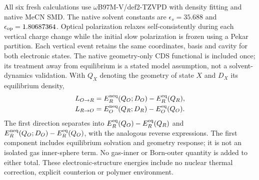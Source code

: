 \documentclass[11pt]{article}
\begin{document}
All six fresh calculations use $\omega$B97M-V/def2-TZVPD with density fitting and native MeCN SMD. The native solvent constants are $\epsilon_s=35.688$ and $\epsilon_{\rm op}=1.80687364$. Optical polarization relaxes self-consistently during each vertical charge change while the initial slow polarization is frozen using a Pekar partition.\cite{you2015nonequilibrium} Each vertical event retains the same coordinates, basis and cavity for both electronic states. The native geometry-only CDS functional is included once; its treatment away from equilibrium is a stated model assumption, not a solvent-dynamics validation. With $Q_X$ denoting the geometry of state $X$ and $D_X$ its equilibrium density,
\begin{align}
 L_{O\to R}&=E_R^{\rm neq}(Q_O;D_O)-E_R^{\rm eq}(Q_R),\\
 L_{R\to O}&=E_O^{\rm neq}(Q_R;D_R)-E_O^{\rm eq}(Q_O).
\end{align}
The first direction separates into $E_R^{\rm eq}(Q_O)-E_R^{\rm eq}(Q_R)$ and $E_R^{\rm neq}(Q_O;D_O)-E_R^{\rm eq}(Q_O)$, with the analogous reverse expressions. The first component includes equilibrium solvation and geometry response; it is not an isolated gas inner-sphere term. No gas-inner or Born-outer quantity is added to either total. These electronic-structure energies include no nuclear thermal correction, explicit counterion or polymer environment.
\end{document}

